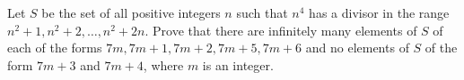 Let $S$ be the set of all positive integers $n$ such that $n^4$ has a divisor in the range $n^2 +1, n^2 + 2,\ldots,n^2 + 2n$. Prove that there are infinitely many elements of $S$ of each of the forms $7m, 7m+1, 7m+2, 7m+5, 7m+6$ and no elements of $S$ of the form $7m+3$ and $7m+4$, where $m$ is an integer.